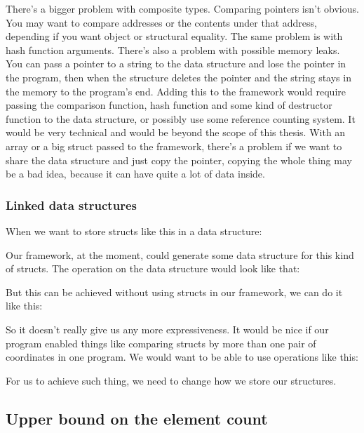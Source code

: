 \documentclass[11pt]{article}
\begin{document}
		There's a bigger problem with composite types. Comparing pointers isn't obvious. You may want to compare
		addresses or the contents under that address, depending if you want object or structural equality. The
		same problem is with hash function arguments. There's also a problem with possible memory leaks. You can
		pass a pointer to a string to the data structure and lose the pointer in the program, then when the
		structure deletes the pointer and the string stays in the memory to the program's end. Adding this to
		the framework would require passing the comparison function, hash function and some kind of destructor
		function to the data structure, or possibly use some reference counting system. It would be very
		technical and would be beyond the scope of this thesis. With an array or a big struct passed to the
		framework, there's a problem if we want to share the data structure and just copy the pointer, copying
		the whole thing may be a bad idea, because it can have quite a lot of data inside.

		\subsubsection{Linked data structures}

			When we want to store structs like this in a data structure:

			

			Our framework, at the moment, could generate some data structure for this kind of structs. The
			operation on the data structure would look like that:

			

			But this can be achieved without using structs in our framework, we can do it like this:

			

			So it doesn't really give us any more expressiveness. It would be nice if our program enabled
			things like comparing structs by more than one pair of coordinates in one program. We would want
			to be able to use operations like this:

			

			For us to achieve such thing, we need to change how we store our structures.

	\subsection{Upper bound on the element count}
\end{document}
